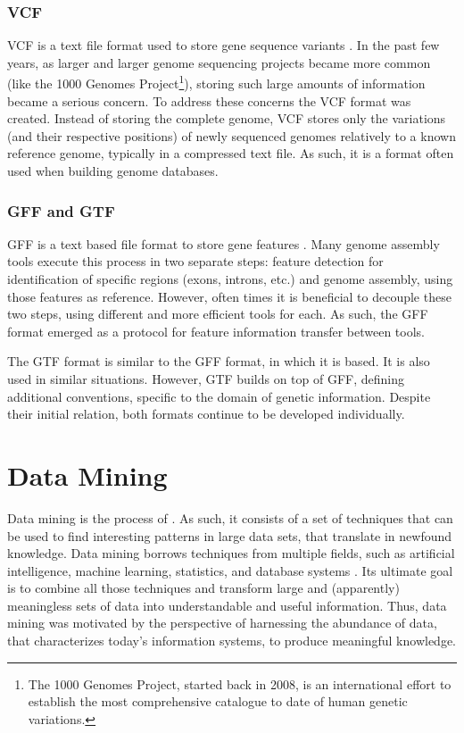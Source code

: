 \subsubsection*{VCF}

VCF is a text file format used to store gene sequence variants \cite{smith13}.
In the past few years, as larger and larger genome sequencing projects became
more common (like the 1000 Genomes Project\footnote{The 1000 Genomes Project,
started back in 2008, is an international effort to establish the most
comprehensive catalogue to date of human genetic variations.}), storing such
large amounts of information became a serious concern. To address these concerns
the VCF format was created. Instead of storing the complete genome, VCF stores
only the variations (and their respective positions) of newly sequenced genomes
relatively to a known reference genome, typically in a compressed text file. As
such, it is a format often used when building genome databases.

\subsubsection*{GFF and GTF}

GFF is a text based file format to store gene features \cite{sanger11}. Many
genome assembly tools execute this process in two separate steps: feature
detection for identification of specific regions (exons, introns, etc.) and
genome assembly, using those features as reference. However, often times it is
beneficial to decouple these two steps, using different and more efficient tools
for each. As such, the GFF format emerged as a protocol for feature information
transfer between tools.

The GTF format is similar to the GFF format, in which it is based. It is also
used in similar situations. However, GTF builds on top of GFF, defining
additional conventions, specific to the domain of genetic information. Despite
their initial relation, both formats continue to be developed individually.

\section{Data Mining}\label{sec:mlearning}

Data mining is the process of  \cite[p. 5]{han2006data}. As such, it consists of a
set of techniques that can be used to find interesting patterns in large data
sets, that translate in newfound knowledge. Data mining borrows techniques from
multiple fields, such as artificial intelligence, machine learning, statistics,
and database systems \cite{Chakrabarti2012}. Its ultimate goal is to combine all
those techniques and transform large and (apparently) meaningless sets of data
into understandable and useful information. Thus, data mining was motivated by
the perspective of harnessing the abundance of data, that characterizes today's
information systems, to produce meaningful knowledge.

